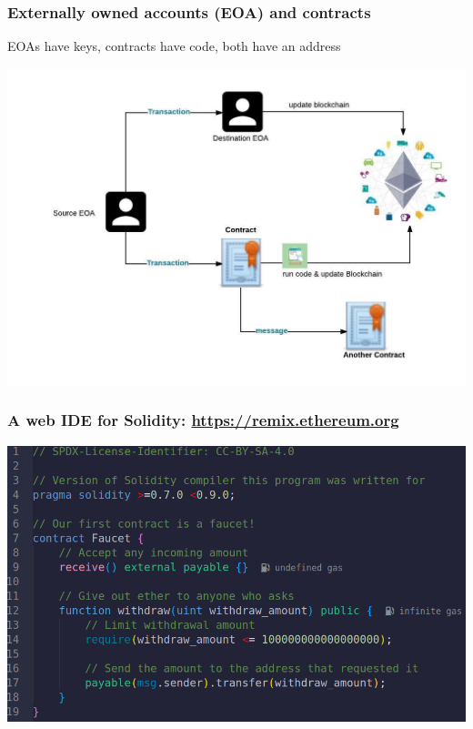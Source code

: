 \documentclass[11pt]{beamer}  %
\begin{document}
\begin{frame}\frametitle{Externally owned accounts (EOA) and contracts}

  \begin{greenbox}{}
    EOAs have keys, contracts have code, both have an address
  \end{greenbox}
  
  \begin{center}
    \includegraphics[scale=0.35,clip=false]{pictures/eoa-contract.jpg}
  \end{center}

\end{frame}

\begin{frame}\frametitle{A web IDE for Solidity: \url{https://remix.ethereum.org}}

  \begin{center}
    \includegraphics[scale=0.35,clip=false]{pictures/faucet_sol.png}
  \end{center}

\end{frame}
\end{document}

